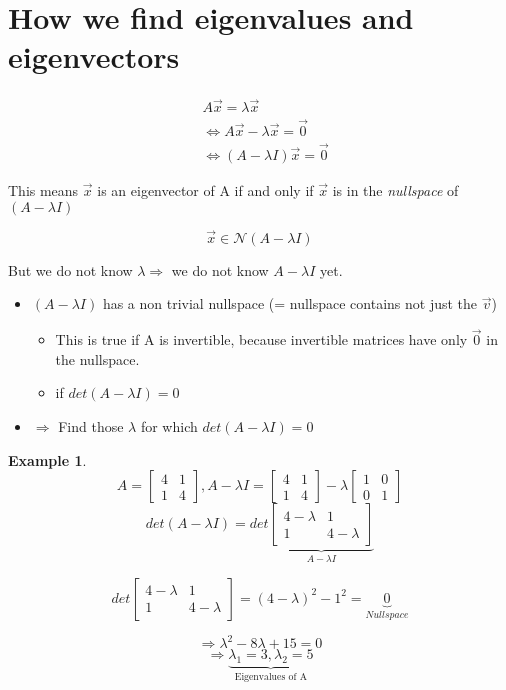 \documentclass[12pt]{amsart}
\newtheorem{example}{Example}      %
\numberwithin{equation}{theorem}    %
\newcommand{\drawvec}[1]{                    %
    \begin{bmatrix}
        #1
    \end{bmatrix}
}
\begin{document}
\section{How we find eigenvalues and eigenvectors}

\begin{align*}
     & A\vec{x} = \lambda \vec{x}                           \\
     & \Leftrightarrow A\vec{x} - \lambda \vec{x} = \vec{0} \\
     & \Leftrightarrow (A - \lambda I)\vec{x} = \vec{0}
\end{align*}

This means $\vec{x}$ is an eigenvector of A if and only if $\vec{x}$ is in the \emph{nullspace} of $(A-\lambda I)$

\begin{equation} \label{eigenvector condition}
    \vec{x} \in \mathcal{N}(A-\lambda I)
\end{equation}

But we do not know $\lambda \Rightarrow$  we do not know $A-\lambda I$ yet.

\begin{itemize}
    \item $(A-\lambda I)$ has a non trivial nullspace (= nullspace contains not just the $\vec{v}$)
          \begin{itemize}
              \item This is true if A is invertible, because invertible matrices have only $\vec{0}$ in the nullspace.
              \item if $det(A-\lambda I) = 0$
          \end{itemize}
    \item $\Rightarrow$ Find those $\lambda$ for which $det(A-\lambda I) = 0$
\end{itemize}

\begin{example}
$$
    A=\drawvec{4 & 1 \\ 1 & 4}, A-\lambda I = \drawvec{4 & 1 \\ 1 & 4} - \lambda \drawvec{1 & 0\\ 0 & 1}
$$
$$
    det(A-\lambda I)
    = det \underbrace{\begin{bmatrix}
            4 - \lambda & 1           \\
            1           & 4 - \lambda
        \end{bmatrix}}_{A-\lambda I}
$$

$$ det\begin{bmatrix}
        4 - \lambda & 1           \\
        1           & 4 - \lambda
    \end{bmatrix} = (4-\lambda)^2 - 1^2 = \underbrace{0}_{Nullspace}$$

$$\Rightarrow \lambda^2 - 8 \lambda +15 = 0$$
$$\Rightarrow \underbrace{\lambda_1 = 3, \lambda_2 = 5}_\text{Eigenvalues of A}$$
\end{example}
\end{document}
